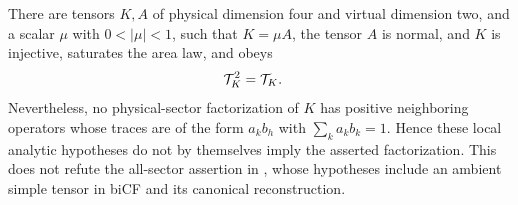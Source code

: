 \begin{lemma}
    \label{thm:mpdo_sal_zcl_bnt_sector_structure_counterexample}
    \leanok
    There are tensors $K,A$ of physical dimension four and virtual dimension
    two, and a scalar $\mu$ with $0<|\mu|<1$, such that $K=\mu A$, the tensor
    $A$ is normal, and $K$ is injective, saturates the area law, and obeys
    \begin{align}
        \mathcal T_K^2 & =\mathcal T_K.
        \notag
    \end{align}
    Nevertheless, no physical-sector factorization of $K$ has positive
    neighboring operators whose traces are of the form $a_kb_h$ with
    $\sum_k a_kb_k=1$. Hence these local analytic hypotheses do not by
    themselves imply the asserted factorization. This does not refute the
    all-sector assertion in
    \cite[Theorem~4.9 and Appendix~C.2, lines~1647--1782]
    {Cirac2016MPDO_arXiv}, whose hypotheses include an ambient simple tensor
    in biCF and its canonical reconstruction.
\end{lemma}

